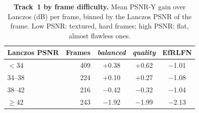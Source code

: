 \begin{table}[t]
\centering
\caption{\textbf{Track~1 by frame difficulty.} Mean PSNR-Y gain over Lanczos (dB) per frame, binned by the Lanczos PSNR of the frame. Low PSNR: textured, hard frames; high PSNR: flat, almost flawless ones.}
\label{tab:flat}
\begin{tabular}{lrccc}
\toprule
Lanczos PSNR & Frames & \emph{balanced} & \emph{quality} & EfRLFN \\
\midrule
$<34$ & 409 & +0.38 & +0.62 & $-$1.01 \\
34--38 & 224 & +0.10 & +0.27 & $-$1.08 \\
38--42 & 216 & $-$0.42 & $-$0.32 & $-$1.04 \\
$\geq42$ & 243 & $-$1.92 & $-$1.99 & $-$2.13 \\
\bottomrule
\end{tabular}
\end{table}
